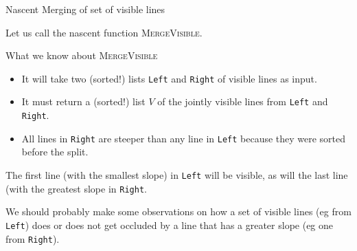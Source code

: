 \documentclass[ignorenonframetext,]{beamer}
\begin{document}
\begin{frame}{Nascent Merging of set of visible lines}

  Let us call the nascent function \textsc{MergeVisible}.

  \begin{block}{What we know about \textsc{MergeVisible}}
    \begin{itemize}
    \item It will take two (sorted!) lists \texttt{Left} and
      \texttt{Right} of visible lines as input. 
    \item It must return a (sorted!) list $V$ of the jointly visible
      lines from \texttt{Left} and \texttt{Right}.
    \item All lines in \texttt{Right} are steeper than any line in
      \texttt{Left} because they were sorted before the split.
    \end{itemize}
  \item The first line (with the smallest slope) in \texttt{Left} will
    be visible, as will the last line (with the greatest slope in \texttt{Right}.
  \end{block}

  We should probably make some observations on how a set of visible lines
  (eg from \texttt{Left}) does or does not get occluded by a line that
  has a greater slope (eg one from \texttt{Right}).

\end{frame}
  
\end{document}
